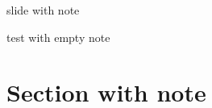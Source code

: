 \documentclass{beamer}
\begin{document}
    \begin{frame}
        slide with note
    \end{frame}

    \begin{frame}
        test with empty note
    \end{frame}

    \section{Section with note}
\end{document}
